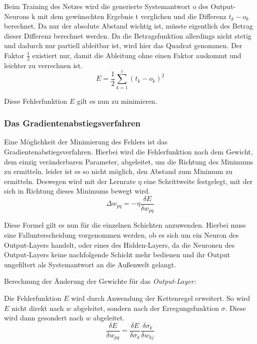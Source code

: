 Beim Training des Netzes wird die generierte Systemantwort o des Output-Neurons k mit dem gewünschten Ergebnis t verglichen und die Differenz $t_k - o_k$ berechnet. Da nur der absolute Abstand wichtig ist, müsste eigentlich des Betrag dieser Differenz berechnet werden. Da die Betragsfunktion allerdings nicht stetig und dadurch nur partiell ableitbar ist, wird hier das Quadrat genommen. Der Faktor $\frac{1}{2}$ existiert nur, damit die Ableitung ohne einen Faktor auskommt und leichter zu verrechnen ist.
\begin{equation}
E = \frac{1}{2} \sum_{k=1}^{c}(t_{k}-o_{k})^2
\end{equation}

Diese Fehlerfunktion $E$ gilt es nun zu minimieren.

\subsubsection{Das Gradientenabstiegsverfahren}
Eine Möglichkeit der Minimierung des Fehlers ist das Gradientenabstiegsverfahren. Hierbei wird die Fehlerfunktion nach dem Gewicht, dem einzig veränderbaren Parameter, abgeleitet, um die Richtung des Minimums zu ermitteln. leider ist es so nicht möglich, den Abstand zum Minimum zu ermitteln. Deswegen wird mit der Lernrate $\eta$ eine Schrittweite festgelegt, mit der sich in Richtung dieses Minimums bewegt wird.
\begin{equation}
\Delta w_{pq}=-\eta \frac{\delta E}{\delta w_{pq}}
\end{equation}

Diese Formel gilt es nun für die einzelnen Schichten anzuwenden. Hierbei muss eine Fallunterscheidung vorgenommen werden, ob es sich um ein Neuron des Output-Layers handelt, oder eines des Hidden-Layers, da die Neuronen des Output-Layers keine nachfolgende Schicht mehr bedienen und ihr Output ungefiltert als Systemantwort an die Außenwelt gelangt.

Berechnung der Änderung der Gewichte für das \emph{Output-Layer:}

Die Fehlerfunktion $E$ wird durch Anwendung der Kettenregel erweitert. So wird $E$ nicht direkt nach $w$ abgeleitet, sondern nach der Erregungsfunktion $\sigma$. Diese wird dann gesondert nach $w$ abgeleitet.
\begin{equation}
\frac{\delta E}{\delta w_{pq}} = \frac{\delta E}{\delta \sigma_{k}} \frac{\delta \sigma_{k}}{\delta w_{kj}}
\label{eqn:output-erw}
\end{equation}


